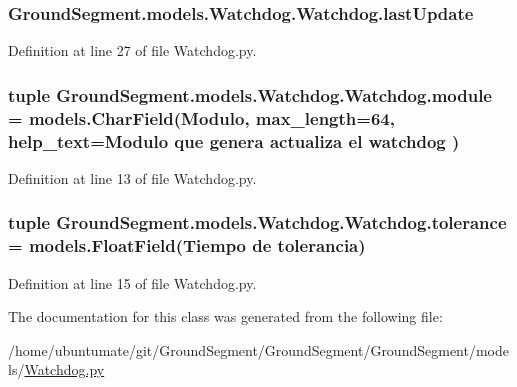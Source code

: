 \subsubsection[{last\+Update}]{\setlength{\rightskip}{0pt plus 5cm}Ground\+Segment.\+models.\+Watchdog.\+Watchdog.\+last\+Update}\label{class_ground_segment_1_1models_1_1_watchdog_1_1_watchdog_a1c3ed2ac40ff216074da715ad3f5eb8a}


Definition at line 27 of file Watchdog.\+py.

\hypertarget{class_ground_segment_1_1models_1_1_watchdog_1_1_watchdog_ad2304bdf1d4275622b13386e224550a3}{}
\subsubsection[{module}]{\setlength{\rightskip}{0pt plus 5cm}tuple Ground\+Segment.\+models.\+Watchdog.\+Watchdog.\+module = models.\+Char\+Field(\textquotesingle{}Modulo\textquotesingle{}, max\+\_\+length=64, help\+\_\+text=\textquotesingle{}Modulo que genera actualiza el watchdog\textquotesingle{} )\hspace{0.3cm}{\ttfamily [static]}}\label{class_ground_segment_1_1models_1_1_watchdog_1_1_watchdog_ad2304bdf1d4275622b13386e224550a3}


Definition at line 13 of file Watchdog.\+py.

\hypertarget{class_ground_segment_1_1models_1_1_watchdog_1_1_watchdog_abb2ac1834f5367e279b537108087a4f8}{}
\subsubsection[{tolerance}]{\setlength{\rightskip}{0pt plus 5cm}tuple Ground\+Segment.\+models.\+Watchdog.\+Watchdog.\+tolerance = models.\+Float\+Field(\textquotesingle{}Tiempo de tolerancia\textquotesingle{})\hspace{0.3cm}{\ttfamily [static]}}\label{class_ground_segment_1_1models_1_1_watchdog_1_1_watchdog_abb2ac1834f5367e279b537108087a4f8}


Definition at line 15 of file Watchdog.\+py.



The documentation for this class was generated from the following file\+:\begin{DoxyCompactItemize}
\item 
/home/ubuntumate/git/\+Ground\+Segment/\+Ground\+Segment/\+Ground\+Segment/models/\hyperlink{_watchdog_8py}{Watchdog.\+py}\end{DoxyCompactItemize}
